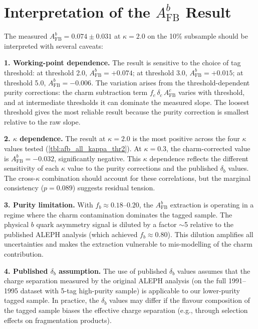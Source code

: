 \documentclass[11pt,a4paper]{article}
\begin{document}
\section{Interpretation of the $A_\text{FB}^b$ Result}
\label{app:afb_interpretation}

The measured $A_\text{FB}^b = 0.074 \pm 0.031$ at $\kappa = 2.0$
on the 10\% subsample should be interpreted with several caveats:

\textbf{1. Working-point dependence.}
The result is sensitive to the choice of tag threshold:
at threshold 2.0, $A_\text{FB}^b = +0.074$;
at threshold 3.0, $A_\text{FB}^b = +0.015$;
at threshold 5.0, $A_\text{FB}^b = -0.006$.
The variation arises from the threshold-dependent purity
corrections: the charm subtraction term
$f_c\,\delta_c\,A_\text{FB}^c$ varies with threshold, and at
intermediate thresholds it can dominate the measured slope.
The loosest threshold gives the most reliable result because the
purity correction is smallest relative to the raw slope.

\textbf{2. $\kappa$ dependence.}
The result at $\kappa = 2.0$ is the most positive across the
four $\kappa$ values tested (\cref{tbl:afb_all_kappa_thr2}).
At $\kappa = 0.3$, the charm-corrected value is
$A_\text{FB}^b = -0.032$, significantly negative.
This $\kappa$ dependence reflects the different sensitivity of
each $\kappa$ value to the purity corrections and the published
$\delta_b$ values.
The cross-$\kappa$ combination should account for these
correlations, but the marginal consistency ($p = 0.089$)
suggests residual tension.

\textbf{3. Purity limitation.}
With $f_b \approx 0.18$--$0.20$, the $A_\text{FB}^b$
extraction is operating in a regime where the charm contamination
dominates the tagged sample.
The physical $b$ quark asymmetry signal is diluted by a factor
$\sim$5 relative to the published ALEPH analysis (which achieved
$f_b \approx 0.80$).
This dilution amplifies all uncertainties and makes the extraction
vulnerable to mis-modelling of the charm contribution.

\textbf{4. Published $\delta_b$ assumption.}
The use of published $\delta_b$ values assumes that the charge
separation measured by the original ALEPH analysis (on the full
1991--1995 dataset with 5-tag high-purity sample) is applicable
to our lower-purity tagged sample.
In practice, the $\delta_b$ values may differ if the flavour
composition of the tagged sample biases the effective charge
separation (e.g., through selection effects on fragmentation
products).
\end{document}
